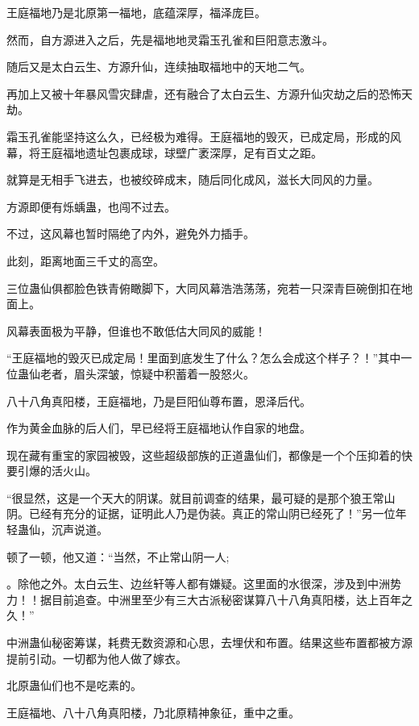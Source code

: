 
\begin{this_body}



王庭福地乃是北原第一福地，底蕴深厚，福泽庞巨。

然而，自方源进入之后，先是福地地灵霜玉孔雀和巨阳意志激斗。

随后又是太白云生、方源升仙，连续抽取福地中的天地二气。

再加上又被十年暴风雪灾肆虐，还有融合了太白云生、方源升仙灾劫之后的恐怖天劫。

霜玉孔雀能坚持这么久，已经极为难得。王庭福地的毁灭，已成定局，形成的风幕，将王庭福地遗址包裹成球，球壁广袤深厚，足有百丈之距。

就算是无相手飞进去，也被绞碎成末，随后同化成风，滋长大同风的力量。

方源即便有烁蝺蛊，也闯不过去。

不过，这风幕也暂时隔绝了内外，避免外力插手。

此刻，距离地面三千丈的高空。

三位蛊仙俱都脸色铁青俯瞰脚下，大同风幕浩浩荡荡，宛若一只深青巨碗倒扣在地面上。

风幕表面极为平静，但谁也不敢低估大同风的威能！

“王庭福地的毁灭已成定局！里面到底发生了什么？怎么会成这个样子？！”其中一位蛊仙老者，眉头深皱，惊疑中积蓄着一股怒火。

八十八角真阳楼，王庭福地，乃是巨阳仙尊布置，恩泽后代。

作为黄金血脉的后人们，早已经将王庭福地认作自家的地盘。

现在藏有重宝的家园被毁，这些超级部族的正道蛊仙们，都像是一个个压抑着的快要引爆的活火山。

“很显然，这是一个天大的阴谋。就目前调查的结果，最可疑的是那个狼王常山阴。已经有充分的证据，证明此人乃是伪装。真正的常山阴已经死了！”另一位年轻蛊仙，沉声说道。

顿了一顿，他又道：“当然，不止常山阴一人;

。除他之外。太白云生、边丝轩等人都有嫌疑。这里面的水很深，涉及到中洲势力！！据目前追查。中洲里至少有三大古派秘密谋算八十八角真阳楼，达上百年之久！”

中洲蛊仙秘密筹谋，耗费无数资源和心思，去埋伏和布置。结果这些布置都被方源提前引动。一切都为他人做了嫁衣。

北原蛊仙们也不是吃素的。

王庭福地、八十八角真阳楼，乃北原精神象征，重中之重。


\end{this_body}
